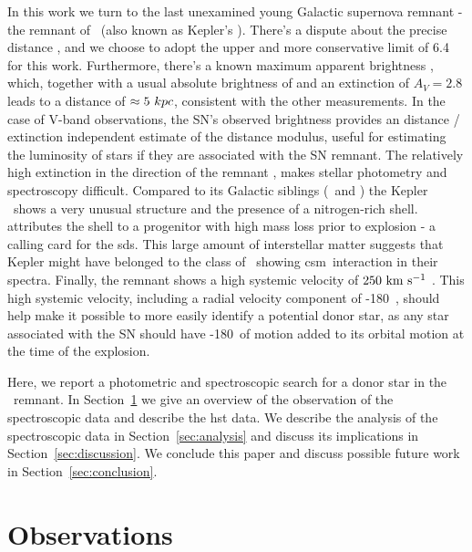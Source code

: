 \documentclass[preprint2]{aastex}
\begin{document}
In this work we turn to the last unexamined young Galactic supernova remnant - the remnant of \ (also known as Kepler's \sn). There's a dispute about the precise distance \citep[$4-6.4$\,\kpc; see][and references therein]{2012A&A...537A.139C}, and we choose to adopt the upper and more conservative limit of 6.4~\kpc\ \citep{1999AJ....118..926R} for this work. Furthermore, there's a known maximum apparent brightness \citep[V=-3;][]{1971SvA....14..798P}, which, together with a usual absolute brightness of \sneia \citep[$M_V=-19.3$;][]{2011ApJ...732..129R} and an extinction of $A_V=2.8$ leads to a distance of $\approx 5~kpc$, consistent with the other measurements. In the case of V-band observations, the SN's observed brightness provides an distance / extinction independent estimate of the distance modulus, useful for estimating the luminosity of stars if they are associated with the SN remnant. The relatively high extinction in the direction of the remnant \citep[$A_V=2.8$, ][]{2007ApJ...668L.135R}, makes stellar photometry and spectroscopy difficult. Compared to its Galactic siblings (\ and ) the Kepler \snr\ shows a very unusual structure and the presence of a nitrogen-rich shell.  \citet{2012A&A...537A.139C} attributes the shell to a progenitor with high mass loss prior to explosion - a calling card for the \gls{sds}. This large amount of interstellar matter suggests that Kepler might have belonged to the class of \sneia\ showing \gls{csm}\ interaction in their spectra. Finally, the remnant shows a high systemic velocity of  $250~\textrm{km}~\textrm{s}^{-1}$ \citep{1991ApJ...366..484B,2003A&A...407..249S}. This high systemic velocity, including a radial velocity component of -180~\kms , should help make it possible to more easily identify a potential donor star, as any star associated with the SN should have -180~\kms of motion added to its orbital motion at the time of the explosion.



Here, we report a photometric and spectroscopic search for a donor star in the \ remnant. In Section~\ref{sec:observations} we give an overview of the observation of the spectroscopic data and describe the \gls{hst} data. We describe the analysis of the spectroscopic data in Section~\ref{sec:analysis} and discuss its implications in Section~\ref{sec:discussion}. We conclude this paper and discuss possible future work in Section~\ref{sec:conclusion}.


\section{Observations}
\label{sec:observations}
\end{document}
